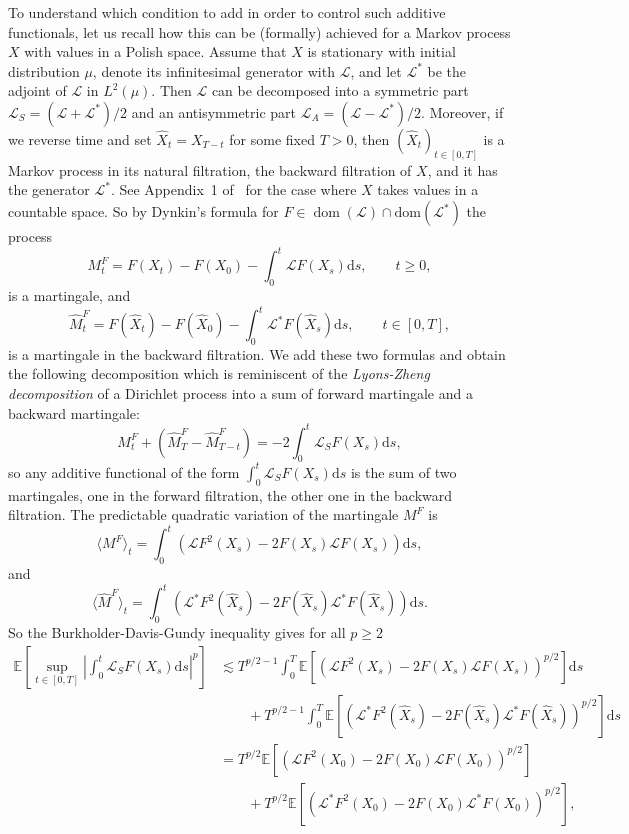 \documentclass[a4paper,11pt]{article}
\newcommand{\mathd}{\mathrm{d}}
\newcommand{\tmop}[1]{\ensuremath{\operatorname{#1}}}
\newcommand{\tmtextit}[1]{{\itshape{#1}}}
\newcommand{\1}{\mathds{1}}
\begin{document}
To understand which condition to add in order to control such additive
functionals, let us recall how this can be (formally) achieved for a Markov
process $X$ with values in a Polish space. Assume that $X$ is stationary with
initial distribution $\mu$, denote its infinitesimal generator with
$\mathcal{L}$, and let $\mathcal{L}^{\ast}$ be the adjoint of $\mathcal{L}$ in
$L^2 (\mu)$. Then $\mathcal{L}$ can be decomposed into a symmetric part
$\mathcal{L}_S = (\mathcal{L}+\mathcal{L}^{\ast}) / 2$ and an antisymmetric
part $\mathcal{L}_A = (\mathcal{L}-\mathcal{L}^{\ast}) / 2$. Moreover, if we
reverse time and set $\hat{X}_t = X_{T - t}$ for some fixed $T > 0$, then
$(\hat{X}_t)_{t \in [0, T]}$ is a Markov process in its natural filtration,
the backward filtration of $X$, and it has the generator $\mathcal{L}^{\ast}$.
See Appendix~1 of~{\cite{KL13}} for the case where $X$ takes values in
a countable space. So by Dynkin's formula for $F \in \tmop{dom}
(\mathcal{L})\cap\mathrm{dom}(\mathcal{L}^\ast)$ the process
\[ M^F_t = F (X_t) - F (X_0) - \int_0^t \mathcal{L}F (X_s) \mathd s, \qquad t
   \geqslant 0, \]
is a martingale, and
\[ \hat{M}^F_t = F (\hat{X}_t) - F (\hat{X}_0) - \int_0^t \mathcal{L}^{\ast} F
   (\hat{X}_s) \mathd s, \qquad t \in [0, T], \]
is a martingale in the backward filtration. We add these two formulas and
obtain the following decomposition which is reminiscent of the \tmtextit{Lyons-Zheng decomposition} of a Dirichlet process into a sum of forward martingale and a backward martingale:
\[ M^F_t + (\hat{M}^F_T - \hat{M}^F_{T - t}) = - 2 \int_0^t \mathcal{L}_S F
   (X_s) \mathd s, \]
so any additive functional of the form $\int_0^t
\mathcal{L}_S F (X_s) \mathd s$ is the sum of two martingales, one in the
forward filtration, the other one in the backward filtration. The predictable
quadratic variation of the martingale $M^F$ is
\[ \langle M^F \rangle_t = \int_0^t (\mathcal{L}F^2 (X_s) - 2 F (X_s)
   \mathcal{L}F (X_s)) \mathd s, \]
and
\[ \langle \hat{M}^F \rangle_t = \int_0^t (\mathcal{L}^{\ast} F^2 (\hat{X}_s)
   - 2 F (\hat{X}_s)\mathcal{L}^{\ast} F (\hat{X}_s)) \mathd s. \]
So the Burkholder-Davis-Gundy inequality gives for all $p \geqslant 2$
\begin{align*}
  \mathbb{E} \left[ \sup_{t \in [0, T]} \left| \int_0^t \mathcal{L}_S F (X_s)
  \mathd s \right|^p \right] & \lesssim T^{p / 2 - 1} \int_0^T \mathbb{E}
  [(\mathcal{L}F^2 (X_s) - 2 F (X_s) \mathcal{L}F (X_s))^{p / 2}] \mathd s\\
  &\qquad + T^{p / 2 - 1} \int_0^T \mathbb{E} [(\mathcal{L}^{\ast} F^2 (\hat{X}_s) -
  2 F (\hat{X}_s)\mathcal{L}^{\ast} F (\hat{X}_s))^{p / 2}] \mathd s\\
  & = T^{p / 2} \mathbb{E} [(\mathcal{L}F^2 (X_0) - 2 F (X_0) \mathcal{L}F
  (X_0))^{p / 2}] \\
  &\qquad + T^{p / 2}\mathbb{E} [(\mathcal{L}^{\ast} F^2 (X_0) - 2 F (X_0)
  \mathcal{L}^{\ast} F (X_0))^{p / 2}] ,
\end{align*}
\end{document}

